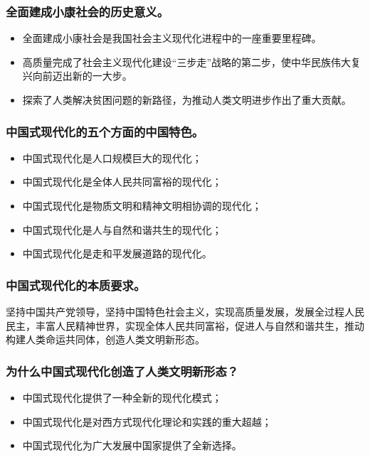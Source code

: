 \documentclass{article}
\begin{document}
\subsubsection{全面建成小康社会的历史意义。}
\begin{itemize}
    \item 全面建成小康社会是我国社会主义现代化进程中的一座重要里程碑。
    \item 高质量完成了社会主义现代化建设“三步走”战略的第二步，使中华民族伟大复兴向前迈出新的一大步。
    \item 探索了人类解决贫困问题的新路径，为推动人类文明进步作出了重大贡献。
\end{itemize}

\subsubsection{中国式现代化的五个方面的中国特色。}
\begin{itemize}
    \item 中国式现代化是人口规模巨大的现代化；
    \item 中国式现代化是全体人民共同富裕的现代化；
    \item 中国式现代化是物质文明和精神文明相协调的现代化；
    \item 中国式现代化是人与自然和谐共生的现代化；
    \item 中国式现代化是走和平发展道路的现代化。
\end{itemize}

\subsubsection{中国式现代化的本质要求。}
坚持中国共产党领导，坚持中国特色社会主义，实现高质量发展，发展全过程人民民主，丰富人民精神世界，实现全体人民共同富裕，促进人与自然和谐共生，推动构建人类命运共同体，创造人类文明新形态。

\subsubsection{为什么中国式现代化创造了人类文明新形态？}
\begin{itemize}
    \item 中国式现代化提供了一种全新的现代化模式；
    \item 中国式现代化是对西方式现代化理论和实践的重大超越；
    \item 中国式现代化为广大发展中国家提供了全新选择。
\end{itemize}
\end{document}

